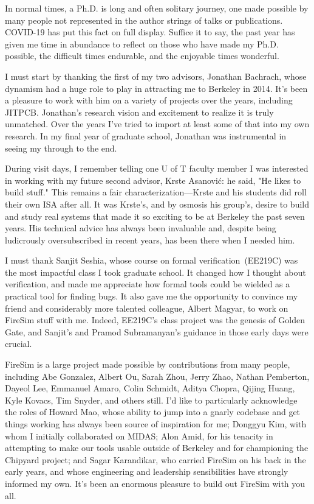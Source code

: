 In normal times, a Ph.D. is long and often solitary journey, one made possible
by many people not represented in the author strings of talks or publications.
COVID-19 has put this fact on full display.
Suffice it to say, the past year has given me time in abundance to reflect on
those who have made my Ph.D. possible, the difficult times
endurable, and the enjoyable times wonderful.

I must start by thanking the first of my two advisors, Jonathan Bachrach, whose
dynamism had a huge role to play in attracting me to Berkeley in 2014. It's
been a pleasure to work with him on a variety of projects over the years,
including JITPCB. Jonathan's research vision and excitement to realize it is truly
unmatched. Over the years I've tried to import at least some of that into my
own research.  In my final year of graduate school, Jonathan was instrumental
in seeing my through to the end.

During visit days, I remember telling one U of T faculty member I was
interested in working with my future second advisor, Krste Asanovi\'c: he said,
"He likes to build stuff." This remains a fair characterization---Krste and his
students did roll their own ISA after all. It was Krste's, and by osmosis his
group's, desire to build and study real systems that made it so exciting to be
at Berkeley the past seven years. His technical advice has always been
invaluable and, despite being ludicrously oversubscribed in recent years, has
been there when I needed him.

I must thank Sanjit Seshia, whose course on formal verification~(EE219C) was the
most impactful class I took graduate school. It changed how I thought about
verification, and made me appreciate how formal tools could be wielded as a practical
tool for finding bugs. It also gave me the opportunity to convince my friend and
considerably more talented colleague, Albert Magyar, to work on FireSim stuff
with me. Indeed, EE219C's class project was the genesis of Golden Gate, and
Sanjit's and Pramod Subramanyan's guidance in those early days were crucial.

FireSim is a large project made possible by contributions from many people,
including Abe Gonzalez, Albert Ou, Sarah Zhou, Jerry Zhao, Nathan Pemberton,
Dayeol Lee, Emmanuel Amaro, Colin Schmidt, Aditya Chopra,
Qijing Huang, Kyle Kovacs, Tim Snyder, and others still. I'd like to
particularly acknowledge the roles of Howard Mao, whose ability to jump into a gnarly codebase and
get things working has always been source of inspiration for me; Donggyu Kim,
with whom I initially collaborated on MIDAS; Alon Amid, for his tenacity in
attempting to make our tools usable outside of Berkeley and for championing the
Chipyard project; and Sagar Karandikar, who carried FireSim on
his back in the early years, and whose engineering and leadership
sensibilities have strongly informed my own. It's been an enormous pleasure to build out FireSim with you all.

